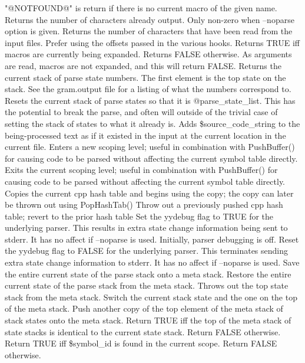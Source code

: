 "@NOTFOUND@" is return if there is no current macro of the given name.
Returns the number of characters already output.  Only non-zero when 
--noparse option is given.
Returns the number of characters that have been read from the
input files.  Prefer using the offsets passed in the various hooks.
Returns TRUE iff macros are currently being expanded.
Returns FALSE otherwise.  As arguments are read, macros are not expanded,
and this will return FALSE.
Returns the current stack of parse state numbers.  The first element is
the top state on the stack.  See the gram.output
file for a listing of what the numbers correspond to.
Resets the current stack of parse states so that it is @parse\_\-state\_\-list.
This has the potential to break the parse, and often will outside
of the trivial case of setting the stack of states to what it already is.
Adds \$source\_\-code\_\-string to the being-processed text 
as if it existed in the input at the
current location in the current file.
Enters a new scoping level; useful in combination
with PushBuffer() for causing code to be parsed without
affecting the current symbol table directly.
Exits the current scoping level; useful in combination
with PushBuffer() for causing code to be parsed without
affecting the current symbol table directly.
Copies the current cpp hash table and begins using the copy;  the copy
can later be thrown out using PopHashTab()
Throw out a previously pushed cpp hash table; revert to the prior
hash table
Set the yydebug flag to TRUE for the underlying parser.
This results in extra state change information being sent to stderr.
It has no affect if --noparse is used.  Initially, parser debugging is off.
Reset the yydebug flag to FALSE for the underlying parser.  
This terminates sending extra state change information to stderr.
It has no affect if --noparse is used.
Save the entire current state of the parse stack onto a meta stack.
Restore the entire current state of the parse stack from the meta stack.
Throws out the top state stack from the meta stack.
Switch the current stack state and the one on the top of the meta stack.
Push another copy of the top element of the meta stack of stack states onto
the meta stack.
Return TRUE iff the top of the meta stack of state stacks is
identical to the current state stack. Return FALSE otherwise.
Return TRUE iff \$symbol\_\-id is found in the current scope.
Return FALSE otherwise.
